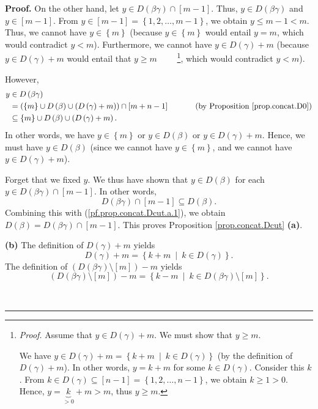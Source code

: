 \documentclass[numbers=enddot,12pt,final,onecolumn,notitlepage]{scrartcl}%
\theoremstyle{definition}
\newenvironment{proof}[1][Proof]{\noindent\textbf{#1.} }{\ \rule{0.5em}{0.5em}}
\begin{document}
\begin{proof}
On the other hand, let $y\in D\left(  \beta\gamma\right)  \cap\left[
m-1\right]  $. Thus, $y\in D\left(  \beta\gamma\right)  $ and $y\in\left[
m-1\right]  $. From $y\in\left[  m-1\right]  =\left\{  1,2,\ldots,m-1\right\}
$, we obtain $y\leq m-1<m$. Thus, we cannot have $y\in\left\{  m\right\}  $
(because $y\in\left\{  m\right\}  $ would entail $y=m$, which would contradict
$y<m$). Furthermore, we cannot have $y\in D\left(  \gamma\right)  +m$ (because
$y\in D\left(  \gamma\right)  +m$ would entail that $y\geq m$%
\ \ \ \ \footnote{\textit{Proof.} Assume that $y\in D\left(  \gamma\right)
+m$. We must show that $y\geq m$.
\par
We have $y\in D\left(  \gamma\right)  +m=\left\{  k+m\ \mid\ k\in D\left(
\gamma\right)  \right\}  $ (by the definition of $D\left(  \gamma\right)
+m$). In other words, $y=k+m$ for some $k\in D\left(  \gamma\right)  $.
Consider this $k$. From $k\in D\left(  \gamma\right)  \subseteq\left[
n-1\right]  =\left\{  1,2,\ldots,n-1\right\}  $, we obtain $k\geq1>0$. Hence,
$y=\underbrace{k}_{>0}+m>m$, thus $y\geq m$.}, which would contradict $y<m$).

However,
\begin{align*}
y  &  \in D\left(  \beta\gamma\right) \\
&  =\left(  \left\{  m\right\}  \cup D\left(  \beta\right)  \cup\left(
D\left(  \gamma\right)  +m\right)  \right)  \cap\left[  m+n-1\right]
\ \ \ \ \ \ \ \ \ \ \left(  \text{by Proposition \ref{prop.concat.D0}}\right)
\\
&  \subseteq\left\{  m\right\}  \cup D\left(  \beta\right)  \cup\left(
D\left(  \gamma\right)  +m\right)  .
\end{align*}
In other words, we have $y\in\left\{  m\right\}  $ or $y\in D\left(
\beta\right)  $ or $y\in D\left(  \gamma\right)  +m$. Hence, we must have
$y\in D\left(  \beta\right)  $ (since we cannot have $y\in\left\{  m\right\}
$, and we cannot have $y\in D\left(  \gamma\right)  +m$).

Forget that we fixed $y$. We thus have shown that $y\in D\left(  \beta\right)
$ for each $y\in D\left(  \beta\gamma\right)  \cap\left[  m-1\right]  $. In
other words,%
\[
D\left(  \beta\gamma\right)  \cap\left[  m-1\right]  \subseteq D\left(
\beta\right)  .
\]
Combining this with (\ref{pf.prop.concat.Dcut.a.1}), we obtain $D\left(
\beta\right)  =D\left(  \beta\gamma\right)  \cap\left[  m-1\right]  $. This
proves Proposition \ref{prop.concat.Dcut} \textbf{(a)}. \medskip

\textbf{(b)} The definition of $D\left(  \gamma\right)  +m$ yields
\begin{equation}
D\left(  \gamma\right)  +m=\left\{  k+m\ \mid\ k\in D\left(  \gamma\right)
\right\}  . \label{pf.prop.concat.Dcut.b.1}%
\end{equation}
The definition of $\left(  D\left(  \beta\gamma\right)  \setminus\left[
m\right]  \right)  -m$ yields%
\begin{equation}
\left(  D\left(  \beta\gamma\right)  \setminus\left[  m\right]  \right)
-m=\left\{  k-m\ \mid\ k\in D\left(  \beta\gamma\right)  \setminus\left[
m\right]  \right\}  . \label{pf.prop.concat.Dcut.b.2}%
\end{equation}



\end{proof}
\end{document}
